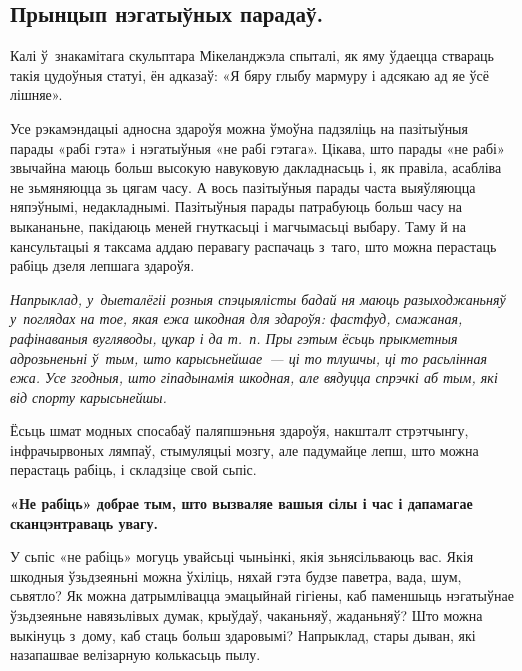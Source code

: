 \subsection*{Прынцып нэгатыўных парадаў.} 

Калі ў~знакамітага скульптара Мікеланджэла спыталі, як яму ўдаецца ствараць такія цудоўныя статуі, ён адказаў: «Я бяру глыбу мармуру і адсякаю ад яе ўсё лішняе». 


Усе рэкамэндацыі адносна здароўя можна ўмоўна падзяліць на пазітыўныя парады «рабі гэта» і нэгатыўныя «не рабі гэтага». Цікава, што парады «не рабі» звычайна маюць больш высокую навуковую дакладнасьць і, як правіла, асабліва не зьмяняюцца зь цягам часу. А вось пазітыўныя парады часта выяўляюцца няпэўнымі, недакладнымі. Пазітыўныя парады патрабуюць больш часу на выкананьне, пакідаюць меней гнуткасьці і магчымасьці выбару. Таму й на кансультацыі я таксама аддаю перавагу распачаць з~таго, што можна перастаць рабіць дзеля лепшага здароўя.

\emph{Напрыклад, у~дыеталёгіі розныя спэцыялісты бадай ня маюць разыходжаньняў у~поглядах на тое, якая ежа шкодная для здароўя: фастфуд, смажаная, рафінаваныя вугляводы, цукар і да т.~п. Пры гэтым ёсьць прыкметныя адрозьненьні ў~тым, што карысьнейшае~--- ці то тлушчы, ці то расьлінная ежа. Усе згодныя, што гіпадынамія шкодная, але вядуцца спрэчкі аб тым, які від спорту карысьнейшы.}

Ёсьць шмат модных спосабаў паляпшэньня здароўя, накшталт стрэтчынгу, інфрачырвоных лямпаў, стымуляцыі мозгу, але падумайце лепш, што можна перастаць рабіць, і складзіце свой сьпіс.

\textbf{«Не рабіць» добрае тым, што вызваляе вашыя сілы і час і дапамагае сканцэнтраваць увагу.}

У сьпіс «не рабіць» могуць увайсьці чыньінкі, якія зьнясільваюць вас. Якія шкодныя ўзьдзеяньні можна ўхіліць, няхай гэта будзе паветра, вада, шум, сьвятло? Як можна датрымлівацца эмацыйнай гігіены, каб паменшыць нэгатыўнае ўзьдзеяньне навязьлівых думак, крыўдаў, чаканьняў, жаданьняў? Што можна выкінуць з~дому, каб стаць больш здаровымі? Напрыклад, стары дыван, які назапашвае велізарную колькасьць пылу.

